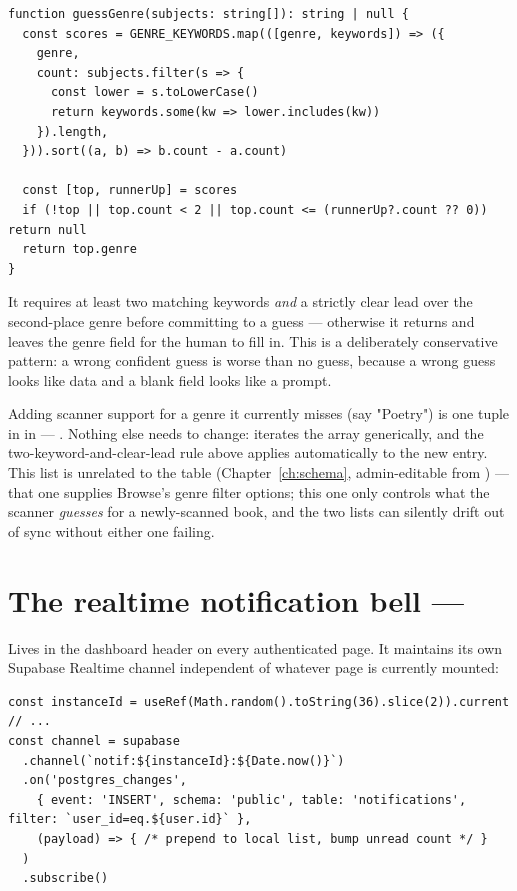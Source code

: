 \begin{lstlisting}[caption={A "clear lead over runner-up" heuristic, not first-match}]
function guessGenre(subjects: string[]): string | null {
  const scores = GENRE_KEYWORDS.map(([genre, keywords]) => ({
    genre,
    count: subjects.filter(s => {
      const lower = s.toLowerCase()
      return keywords.some(kw => lower.includes(kw))
    }).length,
  })).sort((a, b) => b.count - a.count)

  const [top, runnerUp] = scores
  if (!top || top.count < 2 || top.count <= (runnerUp?.count ?? 0)) return null
  return top.genre
}
\end{lstlisting}

It requires at least two matching keywords \emph{and} a strictly clear lead over the second-place genre before committing to a guess — otherwise it returns  and leaves the genre field for the human to fill in. This is a deliberately conservative pattern: a wrong confident guess is worse than no guess, because a wrong guess looks like data and a blank field looks like a prompt.

\begin{olkhowto}
Adding scanner support for a genre it currently misses (say "Poetry") is one tuple in  in  — . Nothing else needs to change:  iterates the array generically, and the two-keyword-and-clear-lead rule above applies automatically to the new entry. This list is unrelated to the  table (Chapter~\ref{ch:schema}, admin-editable from ) — that one supplies Browse's genre filter options; this one only controls what the scanner \emph{guesses} for a newly-scanned book, and the two lists can silently drift out of sync without either one failing.
\end{olkhowto}

\section{The realtime notification bell — }

Lives in the dashboard header on every authenticated page. It maintains its own Supabase Realtime channel independent of whatever page is currently mounted:

\begin{lstlisting}[caption={Instance-unique channel naming to survive Fast Refresh / multiple mounts}]
const instanceId = useRef(Math.random().toString(36).slice(2)).current
// ...
const channel = supabase
  .channel(`notif:${instanceId}:${Date.now()}`)
  .on('postgres_changes',
    { event: 'INSERT', schema: 'public', table: 'notifications', filter: `user_id=eq.${user.id}` },
    (payload) => { /* prepend to local list, bump unread count */ }
  )
  .subscribe()
\end{lstlisting}


